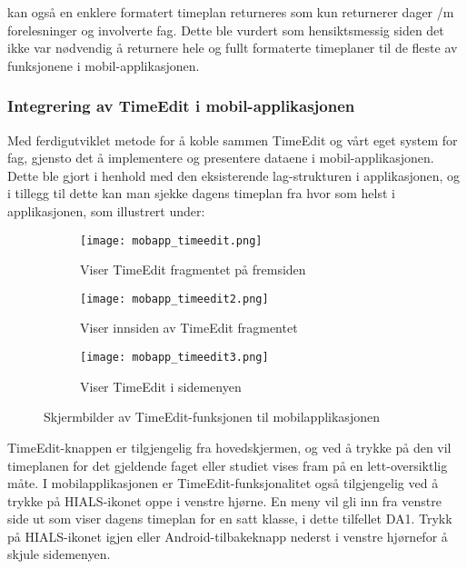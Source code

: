 \documentclass[../main.tex]{subfiles}
\begin{document}
kan også en enklere formatert timeplan returneres som kun returnerer dager /m forelesninger og involverte fag. Dette ble vurdert som hensiktsmessig siden det ikke var nødvendig å returnere hele og fullt formaterte timeplaner til de fleste av funksjonene i mobil-applikasjonen. 

\subsubsection{Integrering av TimeEdit i mobil-applikasjonen}

Med ferdigutviklet metode for å koble sammen TimeEdit og vårt eget system for fag, gjensto det å implementere og presentere dataene i mobil-applikasjonen. Dette ble gjort i henhold med den eksisterende lag-strukturen i applikasjonen, og i tillegg til dette kan man sjekke dagens timeplan fra hvor som helst i applikasjonen, som illustrert under:

\begin{figure}[H]
        \centering
        \begin{subfigure}[b]{0.3\textwidth}
                \centering
                \texttt{[image: mobapp\_timeedit.png]}
                \caption{Viser TimeEdit fragmentet på fremsiden}
        \end{subfigure}
        \quad
        \begin{subfigure}[b]{0.3\textwidth}
                \centering
                \texttt{[image: mobapp\_timeedit2.png]}
                \caption{Viser innsiden av TimeEdit fragmentet}
        \end{subfigure}
        \quad
                \begin{subfigure}[b]{0.3\textwidth}
                        \centering
                        \texttt{[image: mobapp\_timeedit3.png]}
                        \caption{Viser TimeEdit i sidemenyen}
                \end{subfigure}
        \caption{Skjermbilder av TimeEdit-funksjonen til mobilapplikasjonen}
\end{figure}

TimeEdit-knappen er tilgjengelig fra hovedskjermen, og ved å trykke på den vil timeplanen for det gjeldende faget eller studiet vises fram på en lett-oversiktlig måte.
I mobilapplikasjonen er TimeEdit-funksjonalitet også tilgjengelig ved å trykke på HIALS-ikonet oppe i venstre hjørne. En meny vil gli inn fra venstre side ut som viser dagens timeplan for en satt klasse, i dette tilfellet DA1. Trykk på HIALS-ikonet igjen eller Android-tilbakeknapp nederst i venstre hjørnefor å skjule sidemenyen.
\end{document}
